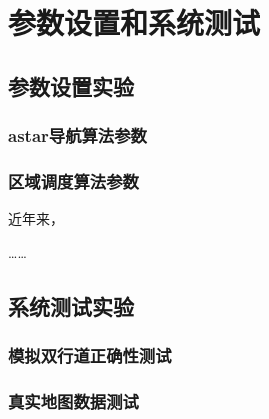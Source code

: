 \chapter{参数设置和系统测试}
\label{chap:intro}
\section{参数设置实验}
\subsection{astar导航算法参数}
\subsection{区域调度算法参数}
近年来，

……

\section{系统测试实验}
\subsection{模拟双行道正确性测试}
\subsection{真实地图数据测试}
